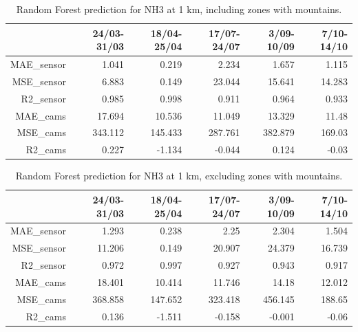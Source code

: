 \begin{table}[H]
\begin{tabular}{rrrrrr}
\hline
     &   24/03-31/03 &   18/04-25/04 &   17/07-24/07 &   3/09-10/09 &   7/10-14/10 \\
\hline
  MAE\_sensor   &            1.041 &            0.219 &            2.234 &            1.657 &            1.115 \\
  MSE\_sensor   &            6.883 &            0.149 &           23.044 &           15.641 &           14.283 \\
  R2\_sensor    &            0.985 &            0.998 &            0.911 &            0.964 &            0.933 \\
  MAE\_cams     &           17.694 &           10.536 &           11.049 &           13.329 &           11.48  \\
  MSE\_cams     &          343.112 &          145.433 &          287.761 &          382.879 &          169.03  \\
  R2\_cams      &            0.227 &           -1.134 &           -0.044 &            0.124 &           -0.03  \\
\hline
\end{tabular}
\caption{Random Forest prediction for NH3 at 1 km, including zones with mountains.}
\end{table}


\begin{table}[H]
\begin{tabular}{rrrrrr}
\hline
     &   24/03-31/03 &   18/04-25/04 &   17/07-24/07 &   3/09-10/09 &   7/10-14/10 \\
\hline
  MAE\_sensor   &            1.293 &            0.238 &            2.25  &            2.304 &            1.504 \\
  MSE\_sensor   &           11.206 &            0.149 &           20.907 &           24.379 &           16.739 \\
  R2\_sensor    &            0.972 &            0.997 &            0.927 &            0.943 &            0.917 \\
  MAE\_cams     &           18.401 &           10.414 &           11.746 &           14.18  &           12.012 \\
  MSE\_cams     &          368.858 &          147.652 &          323.418 &          456.145 &          188.65  \\
  R2\_cams      &            0.136 &           -1.511 &           -0.158 &           -0.001 &           -0.06  \\
\hline
\end{tabular}
\caption{Random Forest prediction for NH3 at 1 km, excluding zones with mountains.}
\end{table}


